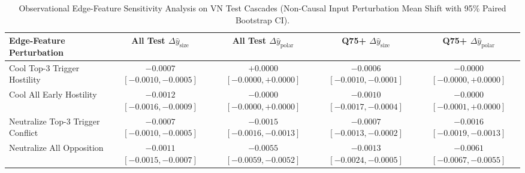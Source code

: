 \begin{table}[t]
\centering
\caption{Observational Edge-Feature Sensitivity Analysis on VN Test Cascades (Non-Causal Input Perturbation Mean Shift with 95\% Paired Bootstrap CI).}
\label{tab:mechanisms_vn}
\begin{tabular}{lcccc}
\toprule
Edge-Feature Perturbation & All Test $\Delta \hat{y}_{\mathrm{size}}$ & All Test $\Delta \hat{y}_{\mathrm{polar}}$ & Q75+ $\Delta \hat{y}_{\mathrm{size}}$ & Q75+ $\Delta \hat{y}_{\mathrm{polar}}$ \\
\midrule
Cool Top-3 Trigger Hostility & $-0.0007$ $[-0.0010, -0.0005]$ & $+0.0000$ $[-0.0000, +0.0000]$ & $-0.0006$ $[-0.0010, -0.0001]$ & $-0.0000$ $[-0.0000, +0.0000]$ \\
Cool All Early Hostility & $-0.0012$ $[-0.0016, -0.0009]$ & $-0.0000$ $[-0.0000, +0.0000]$ & $-0.0010$ $[-0.0017, -0.0004]$ & $-0.0000$ $[-0.0001, +0.0000]$ \\
Neutralize Top-3 Trigger Conflict & $-0.0007$ $[-0.0010, -0.0005]$ & $-0.0015$ $[-0.0016, -0.0013]$ & $-0.0007$ $[-0.0013, -0.0002]$ & $-0.0016$ $[-0.0019, -0.0013]$ \\
Neutralize All Opposition & $-0.0011$ $[-0.0015, -0.0007]$ & $-0.0055$ $[-0.0059, -0.0052]$ & $-0.0013$ $[-0.0024, -0.0005]$ & $-0.0061$ $[-0.0067, -0.0055]$ \\
\bottomrule
\end{tabular}
\end{table}
